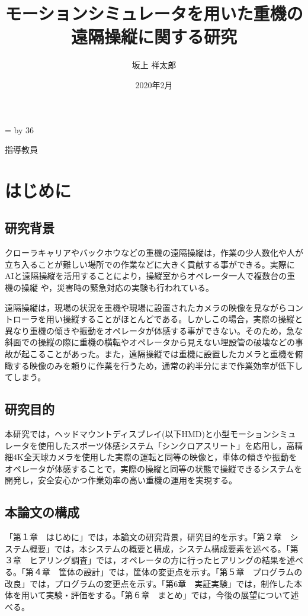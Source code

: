 \documentclass[a4paper,12pt]{jsarticle}
\title{モーションシミュレータを用いた重機の遠隔操縦に関する研究} %
\date{2020年2月} %
\author{坂上 祥太郎} %
\makeatletter
\renewcommand{\maketitle}{
  \begin{titlepage}
    \centering
    {\fontsize{18pt}{36pt}\selectfont \@yearnendo{卒業研究}\par}
    \vspace{42pt}
    \vspace{42pt}
    \vspace{42pt}
    {\huge\textsf{\@title}\par}
    \vspace{42pt}
    \vspace{42pt}
    \vspace{42pt}
    {\fontsize{14pt}{42pt}\selectfont {東京工業高等専門学校　情報工学科}\par}
    {\fontsize{14pt}{42pt}\selectfont \@lab\par}
    {\fontsize{14pt}{42pt}\selectfont {学籍番号:\@studentschoolid}\par}
    {\fontsize{14pt}{42pt}\selectfont {\@studentclassid　\@author}\par}
    \vspace{28pt}
    {\fontsize{14pt}{28pt}\selectfont 指導教員　\@professor\par}
  
    \vfill
  
  \end{titlepage}
}
\def\linesparpage#1{
    \baselineskip=\textheight
    \divide\baselineskip by #1
}
\makeatother
\begin{document}
\linesparpage{36} %

\maketitle

\tableofcontents
\thispagestyle{empty}
\clearpage

\setcounter{page}{1}
\pagestyle{plain}

\section{はじめに}

\subsection{研究背景}
クローラキャリアやバックホウなどの重機の遠隔操縦は，作業の少人数化や人が立ち入ることが難しい場所での作業などに大きく貢献する事ができる。実際にAIと遠隔操縦を活用することにより，操縦室からオペレータ一人で複数台の重機の操縦 \cite{kumagai_AI}や，災害時の緊急対応の実験\cite{kumagai_mujin}も行われている。

遠隔操縦は，現場の状況を重機や現場に設置されたカメラの映像を見ながらコントローラを用い操縦することがほとんどである。しかしこの場合，実際の操縦と異なり重機の傾きや振動をオペレータが体感する事ができない。そのため，急な斜面での操縦の際に重機の横転やオペレータから見えない埋設管の破壊などの事故が起こることがあった。また，遠隔操縦では重機に設置したカメラと重機を俯瞰する映像のみを頼りに作業を行うため，通常の約半分にまで作業効率が低下してしまう\cite{nec}。

\subsection{研究目的}
本研究では，ヘッドマウントディスプレイ(以下HMD)と小型モーションシミュレータを使用したスポーツ体感システム「シンクロアスリート」を応用し，高精細4K全天球カメラを使用した実際の運転と同等の映像と，車体の傾きや振動をオペレータが体感することで，実際の操縦と同等の状態で操縦できるシステムを開発し，安全安心かつ作業効率の高い重機の運用を実現する。

\subsection{本論文の構成}
「第１章　はじめに」では，本論文の研究背景，研究目的を示す。「第２章　システム概要」では，本システムの概要と構成，システム構成要素を述べる。「第３章　ヒアリング調査」では，オペレータの方に行ったヒアリングの結果を述べる。「第４章　筐体の設計」では，筐体の変更点を示す。「第５章　プログラムの改良」では，プログラムの変更点を示す。「第6章　実証実験」では，制作した本体を用いて実験・評価をする。「第６章　まとめ」では，今後の展望について述べる。
\end{document}
